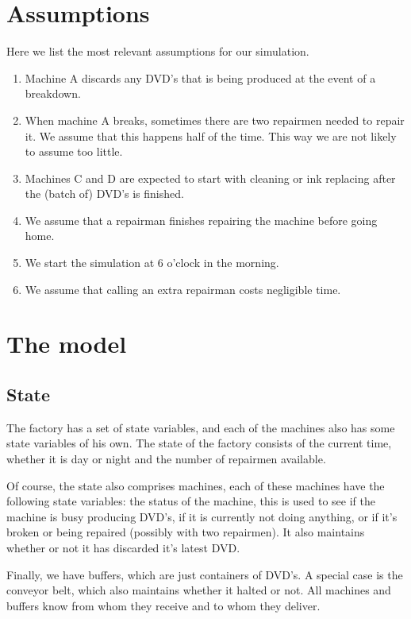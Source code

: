 \documentclass{report}
\begin{document}
\chapter{Assumptions}
Here we list the most relevant assumptions for our simulation.
\begin{enumerate}
    \item
        Machine A discards any DVD's that is being produced at the event of a breakdown.
    \item
        When machine A breaks, sometimes there are two repairmen needed to repair it.
        We assume that this happens half of the time.
        This way we are not likely to assume too little.
    \item
        Machines C and D are expected to start with cleaning or ink replacing after the (batch of) DVD's is finished.
    \item
        We assume that a repairman finishes repairing the machine before going home.
    \item
        We start the simulation at 6 o'clock in the morning.
    \item
        We assume that calling an extra repairman costs negligible time.
\end{enumerate}


\chapter{The model}
\section{State}
The factory has a set of state variables, and each of the machines also has some state variables of his own.
The state of the factory consists of the current time, whether it is day or night and the number of repairmen available.

Of course, the state also comprises machines, each of these machines have the following state variables:
the status of the machine, this is used to see if the machine is busy producing DVD's, if it is currently not doing anything, or if it's broken or being repaired (possibly with two repairmen).
It also maintains whether or not it has discarded it's latest DVD\@.

Finally, we have buffers, which are just containers of DVD's.
A special case is the conveyor belt, which also maintains whether it halted or not.
All machines and buffers know from whom they receive and to whom they deliver.
\end{document}
